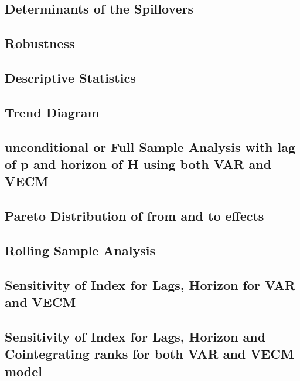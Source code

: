 \documentclass[]{elsarticle} %
\begin{document}
\subsection{Determinants of the
Spillovers}\label{determinants-of-the-spillovers}

\subsection{Robustness}\label{robustness}

\subsection{Descriptive Statistics}\label{descriptive-statistics}

\subsection{Trend Diagram}\label{trend-diagram}

\subsection{unconditional or Full Sample Analysis with lag of p and
horizon of H using both VAR and
VECM}\label{unconditional-or-full-sample-analysis-with-lag-of-p-and-horizon-of-h-using-both-var-and-vecm}

\subsection{Pareto Distribution of from and to
effects}\label{pareto-distribution-of-from-and-to-effects}

\subsection{Rolling Sample Analysis}\label{rolling-sample-analysis}

\subsection{Sensitivity of Index for Lags, Horizon for VAR and
VECM}\label{sensitivity-of-index-for-lags-horizon-for-var-and-vecm}

\subsection{Sensitivity of Index for Lags, Horizon and Cointegrating
ranks for both VAR and VECM
model}\label{sensitivity-of-index-for-lags-horizon-and-cointegrating-ranks-for-both-var-and-vecm-model}
\end{document}
